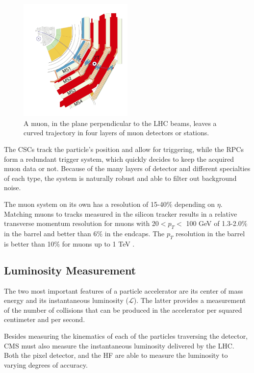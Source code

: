     \begin{figure}[h]
 	\centering
 	\includegraphics[width=0.5\textwidth]{figures/MuStations.png}
 	\singlespace
 	\caption{A muon, in the plane perpendicular to the LHC beams, leaves a curved trajectory in four layers of muon detectors or stations.}
 	\label{fig:cmsmuchambers}
	\end{figure}

The CSCs track the particle's position and allow for triggering, while the RPCs form a redundant trigger system, which quickly decides to keep the acquired muon data or not. Because of the many layers of detector and different specialties of each type, the system is naturally robust and able to filter out background noise.

The muon system on its own has a resolution of 15-40$\%$ depending on $\eta$. Matching muons to tracks measured in the silicon tracker results in a relative transverse momentum resolution for muons with 20$< p_{T} < $ 100 GeV of 1.3-2.0$\%$ in the barrel and better than 6$\%$ in the endcaps. The $p_{T}$ resolution in the barrel is better than 10$\%$ for muons up to 1 TeV \cite{Chatrchyan:2012xi}.

\subsection{Luminosity Measurement}

The two most important features of a particle accelerator are its center of mass energy and its instantaneous luminosity ($\mathcal{L}$). The latter provides a measurement of the number of collisions that can be produced in the accelerator per squared centimeter and per second.

Besides measuring the kinematics of each of the particles traversing the detector, CMS must also measure the instantaneous luminosity delivered by the LHC. Both the pixel detector, and the HF are able to measure the luminosity to varying degrees of accuracy.

